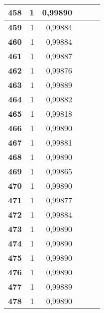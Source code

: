 \begin{longtable}{|r|r|r|l|r|r|}
\textbf{458} & 1 & 0,99890 &  & \multicolumn{1}{l|}{} & \multicolumn{1}{l|}{} \\ \hline
\textbf{459} & 1 & 0,99884 &  & \multicolumn{1}{l|}{} & \multicolumn{1}{l|}{} \\ \hline
\textbf{460} & 1 & 0,99884 &  & \multicolumn{1}{l|}{} & \multicolumn{1}{l|}{} \\ \hline
\textbf{461} & 1 & 0,99887 &  & \multicolumn{1}{l|}{} & \multicolumn{1}{l|}{} \\ \hline
\textbf{462} & 1 & 0,99876 &  & \multicolumn{1}{l|}{} & \multicolumn{1}{l|}{} \\ \hline
\textbf{463} & 1 & 0,99889 &  & \multicolumn{1}{l|}{} & \multicolumn{1}{l|}{} \\ \hline
\textbf{464} & 1 & 0,99882 &  & \multicolumn{1}{l|}{} & \multicolumn{1}{l|}{} \\ \hline
\textbf{465} & 1 & 0,99818 &  & \multicolumn{1}{l|}{} & \multicolumn{1}{l|}{} \\ \hline
\textbf{466} & 1 & 0,99890 &  & \multicolumn{1}{l|}{} & \multicolumn{1}{l|}{} \\ \hline
\textbf{467} & 1 & 0,99881 &  & \multicolumn{1}{l|}{} & \multicolumn{1}{l|}{} \\ \hline
\textbf{468} & 1 & 0,99890 &  & \multicolumn{1}{l|}{} & \multicolumn{1}{l|}{} \\ \hline
\textbf{469} & 1 & 0,99865 &  & \multicolumn{1}{l|}{} & \multicolumn{1}{l|}{} \\ \hline
\textbf{470} & 1 & 0,99890 &  & \multicolumn{1}{l|}{} & \multicolumn{1}{l|}{} \\ \hline
\textbf{471} & 1 & 0,99877 &  & \multicolumn{1}{l|}{} & \multicolumn{1}{l|}{} \\ \hline
\textbf{472} & 1 & 0,99884 &  & \multicolumn{1}{l|}{} & \multicolumn{1}{l|}{} \\ \hline
\textbf{473} & 1 & 0,99890 &  & \multicolumn{1}{l|}{} & \multicolumn{1}{l|}{} \\ \hline
\textbf{474} & 1 & 0,99890 &  & \multicolumn{1}{l|}{} & \multicolumn{1}{l|}{} \\ \hline
\textbf{475} & 1 & 0,99890 &  & \multicolumn{1}{l|}{} & \multicolumn{1}{l|}{} \\ \hline
\textbf{476} & 1 & 0,99890 &  & \multicolumn{1}{l|}{} & \multicolumn{1}{l|}{} \\ \hline
\textbf{477} & 1 & 0,99889 &  & \multicolumn{1}{l|}{} & \multicolumn{1}{l|}{} \\ \hline
\textbf{478} & 1 & 0,99890 &  & \multicolumn{1}{l|}{} & \multicolumn{1}{l|}{} \\ \hline

\end{longtable}
